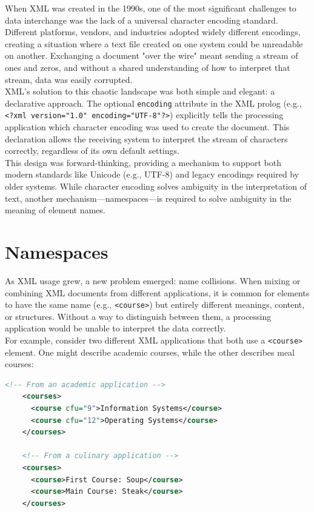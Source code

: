\documentclass{scrbook}
\begin{document}
When XML was created in the 1990s, one of the most significant challenges to data interchange was the lack of a universal character encoding standard. Different platforms, vendors, and industries adopted widely different encodings, creating a situation where a text file created on one system could be unreadable on another. Exchanging a document "over the wire" meant sending a stream of ones and zeros, and without a shared understanding of how to interpret that stream, data was easily corrupted. \\ 

XML's solution to this chaotic landscape was both simple and elegant: a declarative approach. The optional \texttt{encoding} attribute in the XML prolog (e.g., \texttt{\textless ?xml version="1.0" encoding="UTF-8"?\textgreater}) explicitly tells the processing application which character encoding was used to create the document. This declaration allows the receiving system to interpret the stream of characters correctly, regardless of its own default settings. \\ 

This design was forward-thinking, providing a mechanism to support both modern standards like Unicode (e.g., UTF-8) and legacy encodings required by older systems. While character encoding solves ambiguity in the interpretation of text, another mechanism—namespaces—is required to solve ambiguity in the meaning of element names.

\section{Namespaces}

As XML usage grew, a new problem emerged: name collisions. When mixing or combining XML documents from different applications, it is common for elements to have the same name (e.g., \texttt{\textless course\textgreater}) but entirely different meanings, content, or structures. Without a way to distinguish between them, a processing application would be unable to interpret the data correctly. \\

For example, consider two different XML applications that both use a \texttt{\textless course\textgreater} element. One might describe academic courses, while the other describes meal courses: \\

\begin{lstlisting}[language=XML, caption=Example of ambiguous applications]
    <!-- From an academic application -->
    <courses>
      <course cfu="9">Information Systems</course>
      <course cfu="12">Operating Systems</course>
    </courses>
    
    <!-- From a culinary application -->
    <courses>
      <course>First Course: Soup</course>
      <course>Main Course: Steak</course>
    </courses>
\end{lstlisting}
\end{document}
